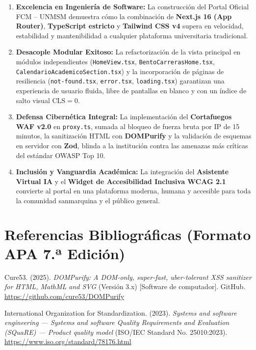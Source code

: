 \documentclass[12pt,a4paper,oneside]{report}
\begin{document}
\begin{enumerate}[label=\textbf{\arabic*.}, leftmargin=1.1cm, itemsep=4pt]
  \item \textbf{Excelencia en Ingeniería de Software:} La construcción del Portal Oficial FCM -- UNMSM demuestra cómo la combinación de \textbf{Next.js 16 (App Router)}, \textbf{TypeScript estricto} y \textbf{Tailwind CSS v4} supera en velocidad, estabilidad y mantenibilidad a cualquier plataforma universitaria tradicional.
  \item \textbf{Desacople Modular Exitoso:} La refactorización de la vista principal en módulos independientes (\texttt{HomeView.tsx}, \texttt{BentoCarrerasHome.tsx}, \texttt{CalendarioAcademicoSection.tsx}) y la incorporación de páginas de resiliencia (\texttt{not-found.tsx}, \texttt{error.tsx}, \texttt{loading.tsx}) garantizan una experiencia de usuario fluida, libre de pantallas en blanco y con un índice de salto visual $\text{CLS} = 0$.
  \item \textbf{Defensa Cibernética Integral:} La implementación del \textbf{Cortafuegos WAF v2.0} en \texttt{proxy.ts}, sumada al bloqueo de fuerza bruta por IP de 15 minutos, la sanitización HTML con \textbf{DOMPurify} y la validación de esquemas en servidor con \textbf{Zod}, blinda a la institución contra las amenazas más críticas del estándar OWASP Top 10.
  \item \textbf{Inclusión y Vanguardia Académica:} La integración del \textbf{Asistente Virtual IA} y el \textbf{Widget de Accesibilidad Inclusiva WCAG 2.1} convierte al portal en una plataforma moderna, humana y accesible para toda la comunidad sanmarquina y el público general.
\end{enumerate}

\newpage
\chapter*{Referencias Bibliográficas (Formato APA 7.ª Edición)}

\begingroup
\setlength{\parindent}{-1.27cm}
\setlength{\leftskip}{1.27cm}
\setlength{\parskip}{0.6em}
\raggedright

\noindent
Cure53. (2025). \textit{DOMPurify: A DOM-only, super-fast, uber-tolerant XSS sanitizer for HTML, MathML and SVG} (Versión 3.x) [Software de computador]. GitHub. \url{https://github.com/cure53/DOMPurify}

\noindent
International Organization for Standardization. (2023). \textit{Systems and software engineering --- Systems and software Quality Requirements and Evaluation (SQuaRE) --- Product quality model} (ISO/IEC Standard No. 25010:2023). \url{https://www.iso.org/standard/78176.html}
\end{document}
